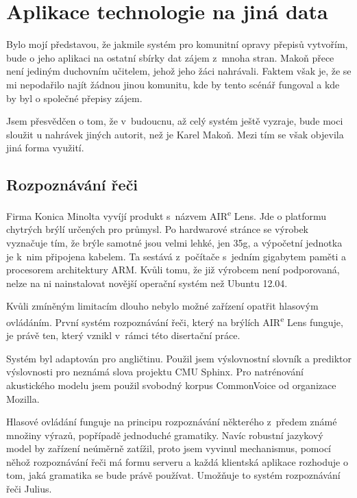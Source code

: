 \chapter{Aplikace technologie na jiná data}
\label{kap:jina-data}

Bylo mojí představou, že jakmile systém pro komunitní opravy přepisů vytvořím,
bude o jeho aplikaci na ostatní sbírky dat zájem z~mnoha stran. Makoň přece není
jediným duchovním učitelem, jehož jeho žáci nahrávali. Faktem však je, že se mi
nepodařilo najít žádnou jinou komunitu, kde by tento scénář fungoval a kde by
byl o společné přepisy zájem.

Jsem přesvědčen o tom, že v~budoucnu, až celý systém ještě vyzraje, bude moci
sloužit u nahrávek jiných autorit, než je Karel Makoň. Mezi tím se však objevila jiná
forma využití.

\section{Rozpoznávání řeči}

Firma Konica Minolta vyvíjí produkt s~názvem AIR\textsuperscript{e} Lens. Jde o platformu
chytrých brýlí určených pro průmysl. Po hardwarové stránce se výrobek vyznačuje
tím, že brýle samotné jsou velmi lehké, jen 35g, a výpočetní jednotka je k~nim
připojena kabelem. Ta sestává z~počítače s~jedním gigabytem paměti a procesorem
architektury ARM. Kvůli tomu, že již výrobcem není podporovaná, nelze na ni
nainstalovat novější operační systém než Ubuntu 12.04.

Kvůli zmíněným limitacím dlouho nebylo možné zařízení opatřit hlasovým
ovládáním. První systém rozpoznávání řeči, který na brýlích AIR\textsuperscript{e} Lens
funguje, je právě ten, který vznikl v~rámci této disertační práce.

Systém byl adaptován pro angličtinu. Použil jsem výslovnostní slovník a
prediktor výslovnosti pro neznámá slova projektu CMU Sphinx\cite{huggins2006pocketsphinx}\cite{lamere2003cmu}.
Pro natrénování akustického modelu jsem použil svobodný korpus CommonVoice od
organizace Mozilla.

Hlasové ovládání funguje na principu rozpoznávání některého z~předem známé
množiny výrazů, popřípadě jednoduché gramatiky. Navíc robustní jazykový model by
zařízení neúměrně zatížil, proto jsem vyvinul mechanismus, pomocí něhož
rozpoznávání řeči má formu serveru a každá klientská aplikace rozhoduje o tom,
jaká gramatika se bude právě používat. Umožňuje to systém rozpoznávání řeči
Julius\cite{lee2001julius}\cite{lee2009recent}.

